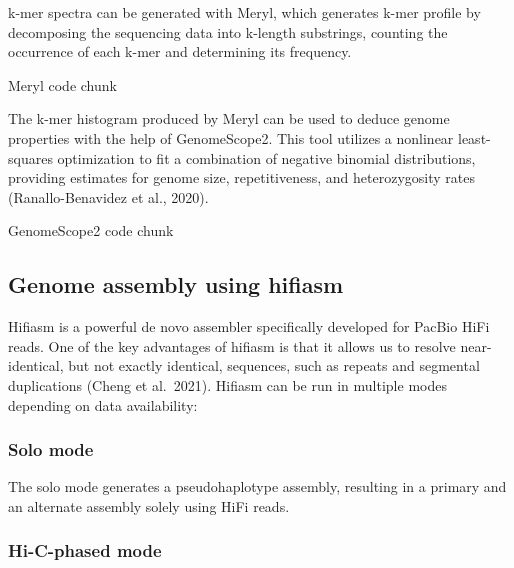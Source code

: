\documentclass[
]{book}
\newenvironment{Shaded}{\begin{snugshade}}{\end{snugshade}}
\newcommand{\ExtensionTok}[1]{#1}
\newcommand{\NormalTok}[1]{#1}
\begin{document}
k-mer spectra can be generated with Meryl, which generates k-mer profile by decomposing the sequencing data into k-length substrings, counting the occurrence of each k-mer and determining its frequency.

\begin{Shaded}
\begin{Highlighting}[]
\ExtensionTok{Meryl}\NormalTok{ code chunk}
\end{Highlighting}
\end{Shaded}

The k-mer histogram produced by Meryl can be used to deduce genome properties with the help of GenomeScope2. This tool utilizes a nonlinear least-squares optimization to fit a combination of negative binomial distributions, providing estimates for genome size, repetitiveness, and heterozygosity rates (Ranallo-Benavidez et al., 2020).

\begin{Shaded}
\begin{Highlighting}[]
\ExtensionTok{GenomeScope2}\NormalTok{ code chunk}
\end{Highlighting}
\end{Shaded}

\hypertarget{host-genome-assembly-hifiasm}{%
\subsection{Genome assembly using hifiasm}\label{host-genome-assembly-hifiasm}}

Hifiasm is a powerful de novo assembler specifically developed for PacBio HiFi reads. One of the key advantages of hifiasm is that it allows us to resolve near-identical, but not exactly identical, sequences, such as repeats and segmental duplications (Cheng et al.~2021). Hifiasm can be run in multiple modes depending on data availability:

\hypertarget{host-genome-assembly-hifiasm-solo}{%
\subsubsection*{Solo mode}\label{host-genome-assembly-hifiasm-solo}}

The solo mode generates a pseudohaplotype assembly, resulting in a primary and an alternate assembly solely using HiFi reads.

\hypertarget{host-genome-assembly-hifiasm-Hi-C}{%
\subsubsection*{Hi-C-phased mode}\label{host-genome-assembly-hifiasm-Hi-C}}
\end{document}
